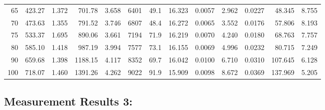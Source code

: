 \documentclass[10pt]{article}
\begin{document}
{\begin{tabular}{|r|rr|rr|rr|rr|rr|r|r|}
       65 &       423.27 &        1.372 &       701.78 &        3.658 &         6401 &         49.1 &       16.323 &       0.0057 &        2.962 &       0.0227 &       48.345 &        8.755 \\
       70 &       473.63 &        1.355 &       791.52 &        3.746 &         6807 &         48.4 &       16.272 &       0.0065 &        3.552 &       0.0176 &       57.806 &        8.193 \\
       75 &       533.37 &        1.695 &       890.06 &        3.661 &         7194 &         71.9 &       16.219 &       0.0070 &        4.240 &       0.0180 &       68.763 &        7.757 \\
       80 &       585.10 &        1.418 &       987.19 &        3.994 &         7577 &         73.1 &       16.155 &       0.0069 &        4.996 &       0.0232 &       80.715 &        7.249 \\
       90 &       659.68 &        1.398 &      1188.15 &        4.117 &         8352 &         69.7 &       16.042 &       0.0100 &        6.710 &       0.0310 &      107.645 &        6.128 \\
      100 &       718.07 &        1.460 &      1391.26 &        4.262 &         9022 &         91.9 &       15.909 &       0.0098 &        8.672 &       0.0369 &      137.969 &        5.205 \\
\hline
\end{tabular}
}



\subsection*{\large \bf Measurement Results 3:}
\end{document}
